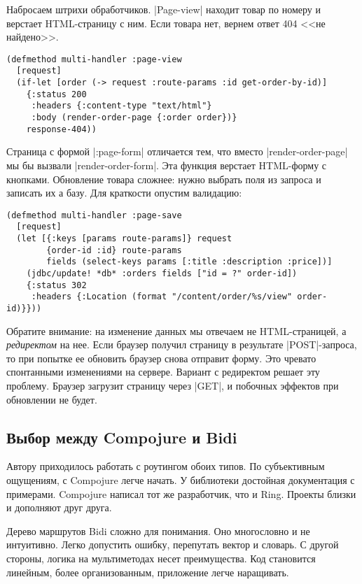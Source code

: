 Набросаем штрихи обработчиков. \spverb|Page-view| находит товар по номеру и
верстает HTML-страницу с ним. Если товара нет, вернем ответ 404 <<не найдено>>.

\begin{verbatim}
(defmethod multi-handler :page-view
  [request]
  (if-let [order (-> request :route-params :id get-order-by-id)]
    {:status 200
     :headers {:content-type "text/html"}
     :body (render-order-page {:order order})}
    response-404))
\end{verbatim}

Страница с формой \spverb|:page-form| отличается тем, что вместо
\spverb|render-order-page| мы бы вызвали \spverb|render-order-form|. Эта
функция верстает HTML-форму с кнопками. Обновление товара сложнее: нужно выбрать поля из
запроса и записать их а базу. Для краткости опустим валидацию:

\begin{verbatim}
(defmethod multi-handler :page-save
  [request]
  (let [{:keys [params route-params]} request
        {order-id :id} route-params
        fields (select-keys params [:title :description :price])]
    (jdbc/update! *db* :orders fields ["id = ?" order-id])
    {:status 302
     :headers {:Location (format "/content/order/%s/view" order-id)}}))
\end{verbatim}

Обратите внимание: на изменение данных мы отвечаем не HTML-страницей, а
\emph{редиректом} на нее. Если браузер получил страницу в результате
\spverb|POST|-запроса, то при попытке ее обновить браузер снова отправит
форму. Это чревато спонтанными изменениями на сервере. Вариант с редиректом решает
эту проблему. Браузер загрузит страницу через \spverb|GET|, и побочных эффектов
при обновлении не будет.


\subsection{Выбор между Compojure и Bidi}

Автору приходилось работать с роутингом обоих типов. По субъективным ощущениям,
с Compojure легче начать. У библиотеки достойная документация с
примерами. Compojure написал тот же разработчик, что и Ring. Проекты близки и
дополняют друг друга.

Дерево маршрутов Bidi сложно для понимания. Оно многословно и не
интуитивно. Легко допустить ошибку, перепутать вектор и словарь. С другой
стороны, логика на мультиметодах несет преимущества. Код становится линейным,
более организованным, приложение легче наращивать.

